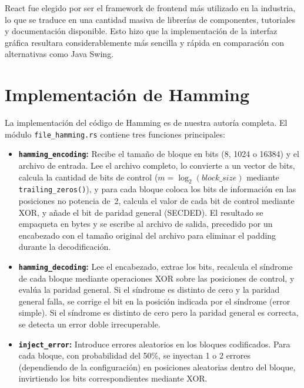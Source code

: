 React fue elegido por ser el framework de frontend más utilizado en la industria, lo que se traduce en una cantidad masiva de librerías de componentes, tutoriales y documentación disponible. Esto hizo que la implementación de la interfaz gráfica resultara considerablemente más sencilla y rápida en comparación con alternativas como Java Swing.


\section*{Implementación de Hamming}


La implementación del código de Hamming es de nuestra autoría completa. El módulo \texttt{file\_hamming.rs} contiene tres funciones principales:

\begin{itemize}
    \item \textbf{\texttt{hamming\_encoding}:} Recibe el tamaño de bloque en bits (8, 1024 o 16384) y el archivo de entrada. Lee el archivo completo, lo convierte a un vector de bits, calcula la cantidad de bits de control ($m = \log_2(\textit{block\_size})$ mediante \texttt{trailing\_zeros()}), y para cada bloque coloca los bits de información en las posiciones no potencia de~2, calcula el valor de cada bit de control mediante XOR, y añade el bit de paridad general (SECDED). El resultado se empaqueta en bytes y se escribe al archivo de salida, precedido por un encabezado con el tamaño original del archivo para eliminar el padding durante la decodificación.

    \item \textbf{\texttt{hamming\_decoding}:} Lee el encabezado, extrae los bits, recalcula el síndrome de cada bloque mediante operaciones XOR sobre las posiciones de control, y evalúa la paridad general. Si el síndrome es distinto de cero y la paridad general falla, se corrige el bit en la posición indicada por el síndrome (error simple). Si el síndrome es distinto de cero pero la paridad general es correcta, se detecta un error doble irrecuperable.

    \item \textbf{\texttt{inject\_error}:} Introduce errores aleatorios en los bloques codificados. Para cada bloque, con probabilidad del 50\%, se inyectan 1 o 2 errores (dependiendo de la configuración) en posiciones aleatorias dentro del bloque, invirtiendo los bits correspondientes mediante XOR.
\end{itemize}


